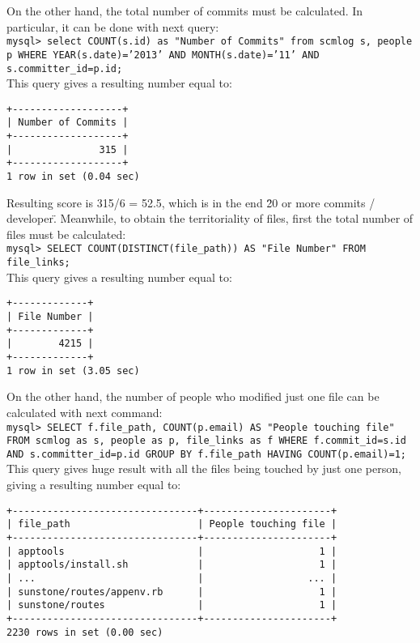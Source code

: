 \documentclass[11pt]{article}
\newcommand{\mysqlcmd}[1]{\\\indent\indent\texttt{mysql> #1}\\}
\begin{document}
\begin{itemize}
\begin{itemize}
On the other hand, the total number of commits must be calculated. In particular, it can be done with next query:
\mysqlcmd{select COUNT(s.id) as "Number of Commits" from scmlog s, people p WHERE YEAR(s.date)='2013' AND MONTH(s.date)='11' AND s.committer\_id=p.id;}
This query gives a resulting number equal to:
\begin{verbatim}
+-------------------+
| Number of Commits |
+-------------------+
|               315 |
+-------------------+
1 row in set (0.04 sec)
\end{verbatim}
Resulting score is 315/6 = 52.5, which is in the end \"20 or more commits / developer\".
Meanwhile, to obtain the territoriality of files, first the total number of files must be calculated:
\mysqlcmd{SELECT COUNT(DISTINCT(file\_path)) AS "File Number" FROM file\_links;}
This query gives a resulting number equal to:
\begin{verbatim}
+-------------+
| File Number |
+-------------+
|        4215 |
+-------------+
1 row in set (3.05 sec)
\end{verbatim}
On the other hand, the number of people who modified just one file can be calculated with next command:
\mysqlcmd{SELECT f.file\_path, COUNT(p.email) AS "People touching file" FROM scmlog as s, people as p, file\_links as f WHERE f.commit\_id=s.id AND s.committer\_id=p.id GROUP BY f.file\_path HAVING COUNT(p.email)=1;}
This query gives huge result with all the files being touched by just one person, giving a resulting number equal to:
\begin{verbatim}
+--------------------------------+----------------------+
| file_path                      | People touching file |
+--------------------------------+----------------------+
| apptools                       |                    1 |
| apptools/install.sh            |                    1 |
| ...                            |                  ... |
| sunstone/routes/appenv.rb      |                    1 |
| sunstone/routes                |                    1 |
+--------------------------------+----------------------+
2230 rows in set (0.00 sec)


\end{verbatim}
\end{itemize}
\end{itemize}
\end{document}
